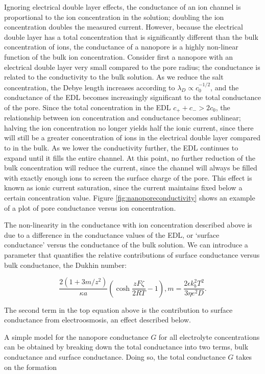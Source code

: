			Ignoring electrical double layer effects, the conductance of an ion channel is proportional to the ion concentration in the solution; doubling the ion concentration doubles the measured current. However, because the electrical double layer has a total concentration that is significantly different than the bulk concentration of ions, the conductance of a nanopore is a highly non-linear function of the bulk ion concentration. Consider first a nanopore with an electrical double layer very small compared to the pore radius; the conductance is related to the conductivity to the bulk solution. As we reduce the salt concentration, the Debye length increases according to $\lambda_{D}\propto c_{0}^{-1/2}$, and the conductance of the EDL becomes increasingly significant to the total conductance of the pore. Since the total concentration in the EDL $c_{+}+c_{-}>2c_{0}$, the relationship between ion concentration and conductance becomes sublinear; halving the ion concentration no longer yields half the ionic current, since there will still be a greater concentration of ions in the electrical double layer compared to in the bulk. As we lower the conductivity further, the EDL continues to expand until it fills the entire channel. At this point, no further reduction of the bulk concentration will reduce the current, since the channel will always be filled with exactly enough ions to screen the surface charge of the pore. This effect is known as ionic current saturation, since the current maintains fixed below a certain concentration value. Figure \ref{fig:nanoporeconductivity} shows an example of a plot of pore conductance versus ion concentration.
			
			The non-linearity in the conductance with ion concentration described above is due to a difference in the conductance values of the EDL, or `surface conductance' versus the conductance of the bulk solution. We can introduce a parameter that quantifies the relative contributions of surface conductance versus bulk conductance, the Dukhin number:
			
			\begin{equation} \label{dukhin}
				\frac{2\left(1+3m/z^{2}\right)}{\kappa a}\left(\cosh\frac{zF\zeta}{2RT}-1\right),
				m=\frac{2\epsilon k_{b}^{2}T^{2}}{3\eta e^{2}D}.
			\end{equation}
			
			The second term in the top equation above is the contribution to surface conductance from electroosmosis, an effect described below.
			
			A simple model for the nanopore conductance $G$ for all electrolyte concentrations can be obtained by breaking down the total conductance into two terms, bulk conductance and surface conductance. Doing so, the total conductance $G$ takes on the formation
			
